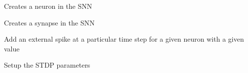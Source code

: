 \documentclass[letterpaper,10pt,english]{sphinxmanual}
\begin{document}
\begin{fulllineitems}
\begin{fulllineitems}
\begin{quote}
\begin{description}
\end{description}\end{quote}

\end{fulllineitems}


\begin{fulllineitems}
\label{\detokenize{index:superneuromat.SNN.create_neuron}}
\pysigstartsignatures
\pysiglinewithargsret
{}
{}
{}
\pysigstopsignatures
\sphinxAtStartPar
Creates a neuron in the SNN

\end{fulllineitems}


\begin{fulllineitems}
\label{\detokenize{index:superneuromat.SNN.create_synapse}}
\pysigstartsignatures
\pysiglinewithargsret
{}
{}
{}
\pysigstopsignatures
\sphinxAtStartPar
Creates a synapse in the SNN

\end{fulllineitems}


\begin{fulllineitems}
\label{\detokenize{index:superneuromat.SNN.add_spike}}
\pysigstartsignatures
\pysiglinewithargsret
{}
{}
{}
\pysigstopsignatures
\sphinxAtStartPar
Add an external spike at a particular time step for a given neuron with a given value

\end{fulllineitems}


\begin{fulllineitems}
\label{\detokenize{index:superneuromat.SNN.stdp_setup}}
\pysigstartsignatures
\pysiglinewithargsret
{}
{}
{}
\pysigstopsignatures
\sphinxAtStartPar
Setup the STDP parameters

\end{fulllineitems}


\end{fulllineitems}
\end{document}
